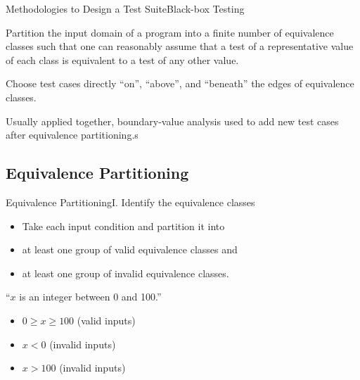\begin{Frame}{Methodologies to Design a Test Suite}{Black-box Testing}
  \begin{definition}
    Partition the \alert{input domain} of a program into a finite number of
    \alert{equivalence classes} such that one can \alert{reasonably assume} that a test of a representative value of each class is equivalent to a test of any other value.
  \end{definition}

  \xxx

  \begin{definition}
    Choose test cases directly \enquote{on}, \enquote{above}, and \enquote{beneath} the edges of equivalence classes.
  \end{definition}

  \xxx

  Usually applied together, boundary-value analysis used to add new test cases after equivalence partitioning.s
\end{Frame}


\subsection{Equivalence Partitioning}

\begin{Frame}{Equivalence Partitioning}{I. Identify the equivalence classes}
  \begin{itemize}
    \item Take \alert{each input condition} and partition it into
    \item at least one group of \alert{valid equivalence classes} and
    \item at least one group of \alert{invalid equivalence classes}.
  \end{itemize}

  \xxx

  \begin{example}
    \newline
    \enquote{$x$ is an integer between 0 and 100.}\hfill\vspace{1ex}\linebreak
    

    \begin{itemize}
      \item $0 \ge x \ge 100$ (valid inputs)
      \item $x < 0$ (invalid inputs)
      \item $x > 100$ (invalid inputs)
    \end{itemize}
  \end{example}
\end{Frame}

